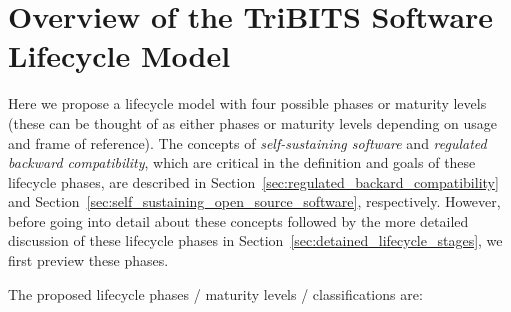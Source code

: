 \documentclass[11pt]{SANDreport}
\begin{document}
%
{}\section{Overview of the TriBITS Software Lifecycle Model}
\label{sec:life_cycle_overview}
%

Here we propose a lifecycle model with four possible phases or
maturity levels (these can be thought of as either phases or maturity
levels depending on usage and frame of reference).  The concepts of
\textit{self-sustaining software} and \textit{regulated backward compatibility},
which are critical in the definition and goals of these lifecycle
phases, are described in
Section~\ref{sec:regulated_backard_compatibility} and
Section~\ref{sec:self_sustaining_open_source_software}, respectively.
However, before going into detail about these concepts followed by the
more detailed discussion of these lifecycle phases in
Section~\ref{sec:detained_lifecycle_stages}, we first preview these phases.

The proposed lifecycle phases / maturity levels / classifications are:
\end{document}
